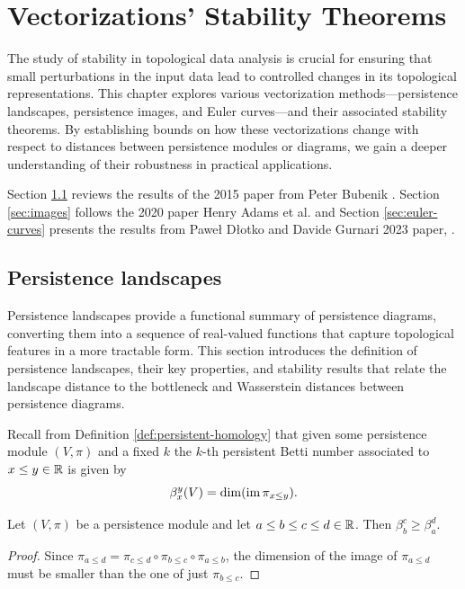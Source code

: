 
\chapter{Vectorizations' Stability Theorems} \label{chap:vectorizations}

The study of stability in topological data analysis is crucial for ensuring that small perturbations in the input data lead to controlled changes in its topological representations. This chapter explores various vectorization methods—persistence landscapes, persistence images, and Euler curves—and their associated stability theorems. By establishing bounds on how these vectorizations change with respect to distances between persistence modules or diagrams, we gain a deeper understanding of their robustness in practical applications.

Section \ref{sec:landscapes} reviews the results of the 2015 paper from Peter Bubenik \cite{bubenik}. Section \ref{sec:images} follows the 2020 paper Henry Adams et al. \cite{adams} and Section \ref{sec:euler-curves} presents the results from Paweł Dłotko and Davide Gurnari 2023 paper, \cite{dlotko}.

\section{Persistence landscapes} \label{sec:landscapes}

Persistence landscapes provide a functional summary of persistence diagrams, converting them into a sequence of real-valued functions that capture topological features in a more tractable form. This section introduces the definition of persistence landscapes, their key properties, and stability results that relate the landscape distance to the bottleneck and Wasserstein distances between persistence diagrams.

Recall from Definition \ref{def:persistent-homology} that given some persistence module $ (V, \pi) $ and a fixed $k$ the $k$-th persistent Betti number associated to $ x \leq y \in \mathbb R $ is given by
\begin{equation}
    \beta_x^y(V) = \dim (\operatorname{im} \pi_{x \leq y}).
\end{equation}

\begin{lemma} \label{lemma:landscapes-aux-1}
    Let $ (V, \pi) $ be a persistence module and let $ a \leq b \leq c \leq d \in \mathbb R $. Then $ \beta_b^c \geq \beta_a^d $.
\end{lemma}
\begin{proof}
    Since $ \pi_{a \leq d} = \pi_{c \leq d} \circ \pi_{b \leq c} \circ \pi_{a \leq b} $, the dimension of the image of $ \pi_{a \leq d} $ must be smaller than the one of just $ \pi_{b \leq c} $.
\end{proof}

